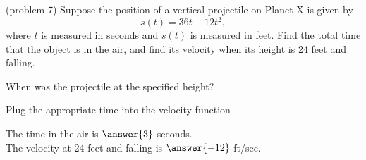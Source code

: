 \documentclass{ximera}
\begin{document}
\begin{problem}(problem 7)
Suppose the position of a vertical projectile on Planet X is given by 
\[s(t) = 36t - 12t^2, \]
where $t$ is measured in seconds and $s(t)$ is measured in feet. 
Find the total time that the object is in the air, and find its velocity when its height is 24 feet and falling.
\begin{hint}
When was the projectile at the specified height?
\end{hint}
\begin{hint}
Plug the appropriate time into the velocity function
\end{hint}

The time in the air is $\answer{3}$ seconds.\\
The velocity at 24 feet and falling is $\answer{-12}$ ft/sec.

\end{problem}


\end{document}
